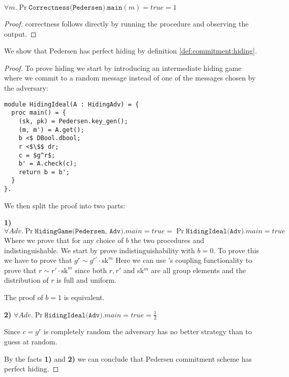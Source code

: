 \begin{lemma}
  $\forall m.\Pr{\texttt{Correctness(Pedersen).main}(m) = true} = 1$
\end{lemma}
\begin{proof}
  correctness follows directly by running the procedure and observing the output.
\end{proof}

\begin{lemma}
  We show that Pedersen has perfect hiding by definition
  \ref{def:commitment:hiding}.
\end{lemma}
\begin{proof}
  To prove hiding we start by introducing an intermediate hiding game where we
  commit to a random message instead of one of the messages chosen by the adversary:
\begin{lstlisting}[mathescape]
module HidingIdeal(A : HidingAdv) = {
  proc main() = {
    (sk, pk) = Pedersen.key_gen();
    (m, m') = A.get();
    b <$ DBool.dbool;
    r <$\$$ dr;
    c = $g^r$;
    b' = A.check(c);
    return b = b';
  }
}.
\end{lstlisting}
  We then split the proof into two parts:

  \noindent\textbf{1) }
  $\forall Adv. \Pr{\texttt{HidingGame(Pedersen, Adv)}.main = true} = \Pr{\texttt{HidingIdeal(Adv)}.main = true}$
  Where we prove that for any choice of $b$ the two procedures and
  indistinguishable. We start by prove indistinguishability with $b = 0$.
  To prove this we have to prove that $g^{r} \sim g^{r'} \cdot \text{sk}^{m}$
  Here we can use \easycrypt's coupling functionality to prove that
  $r \sim r' \cdot \text{sk}^{m}$ since both $r, r'$ and sk$^{m}$ are all group
  elements and the distribution of $r$ is full and uniform.

  The proof of $b = 1$ is equivalent.

  \noindent \textbf{2)}
  $\forall Adv. \Pr{\texttt{HidingIdeal(Adv)}.main = true} = \frac{1}{2}$

  Since $c = g^{r}$ is completely random the adversary has no better strategy
  than to guess at random.


  By the facts \textbf{1)} and \textbf{2)} we can conclude that Pedersen
  commitment scheme has perfect hiding.
\end{proof}

